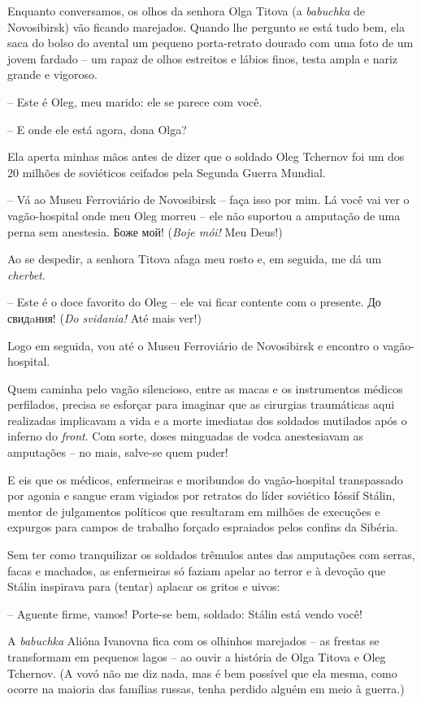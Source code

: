 Enquanto conversamos, os olhos da senhora Olga Titova (a \emph{babuchka}
de Novosibirsk) vão ficando marejados. Quando lhe pergunto se está tudo
bem, ela saca do bolso do avental um pequeno porta-retrato dourado com
uma foto de um jovem fardado -- um rapaz de olhos estreitos e lábios
finos, testa ampla e nariz grande e vigoroso.

-- Este é Oleg, meu marido: ele se parece com você.

-- E onde ele está agora, dona Olga?

Ela aperta minhas mãos antes de dizer que o soldado Oleg Tchernov foi um
dos 20 milhões de soviéticos ceifados pela Segunda Guerra Mundial.

-- Vá ao Museu Ferroviário de Novosibirsk -- faça isso por mim. Lá você
vai ver o vagão-hospital onde meu Oleg morreu -- ele não suportou a
amputação de uma perna sem anestesia. Боже мой! (\emph{Boje mói!} Meu
Deus!)

Ao se despedir, a senhora Titova afaga meu rosto e, em seguida, me dá um
\emph{cherbet}.

-- Este é o doce favorito do Oleg -- ele vai ficar contente com o
presente. До свидaния! (\emph{Do svidania!} Até mais ver!)

Logo em seguida, vou até o Museu Ferroviário de Novosibirsk e encontro o
vagão-hospital.

Quem caminha pelo vagão silencioso, entre as macas e os instrumentos
médicos perfilados, precisa se esforçar para imaginar que as cirurgias
traumáticas aqui realizadas implicavam a vida e a morte imediatas dos
soldados mutilados após o inferno do \emph{front}. Com sorte, doses
minguadas de vodca anestesiavam as amputações -- no mais, salve-se quem
puder!

E eis que os médicos, enfermeiras e moribundos do vagão-hospital
transpassado por agonia e sangue eram vigiados por retratos do líder
soviético Ióssif Stálin, mentor de julgamentos políticos que resultaram
em milhões de execuções e expurgos para campos de trabalho forçado
espraiados pelos confins da Sibéria.

Sem ter como tranquilizar os soldados trêmulos antes das amputações com
serras, facas e machados, as enfermeiras só faziam apelar ao terror e à
devoção que Stálin inspirava para (tentar) aplacar os gritos e uivos:

-- Aguente firme, vamos! Porte-se bem, soldado: Stálin está vendo você!

A \emph{babuchka} Alióna Ivanovna fica com os olhinhos marejados -- as
frestas se transformam em pequenos lagos -- ao ouvir a história de Olga
Titova e Oleg Tchernov. (A vovó não me diz nada, mas é bem possível que
ela mesma, como ocorre na maioria das famílias russas, tenha perdido
alguém em meio à guerra.)

